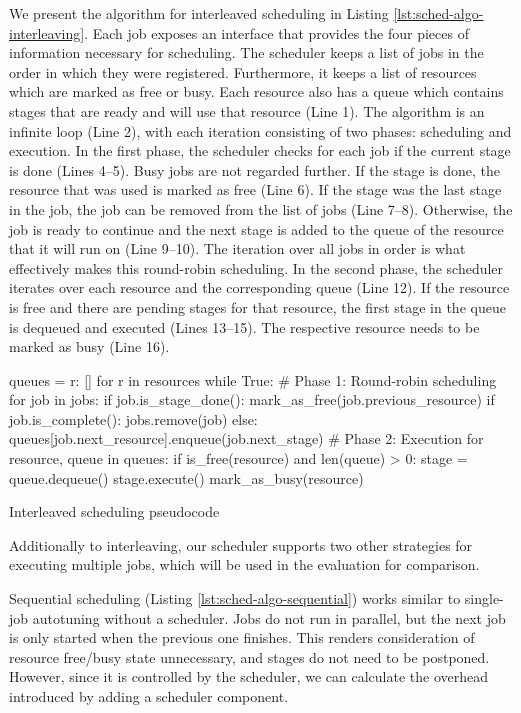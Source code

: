 We present the algorithm for interleaved scheduling in Listing \ref{lst:sched-algo-interleaving}. Each job exposes an interface that provides the four pieces of information necessary for scheduling. The scheduler keeps a list of jobs in the order in which they were registered. Furthermore, it keeps a list of resources which are marked as free or busy. Each resource also has a queue which contains stages that are ready and will use that resource (Line 1). The algorithm is an infinite loop (Line 2), with each iteration consisting of two phases: scheduling and execution. In the first phase, the scheduler checks for each job if the current stage is done (Lines 4--5). Busy jobs are not regarded further. If the stage is done, the resource that was used is marked as free (Line 6). If the stage was the last stage in the job, the job can be removed from the list of jobs (Line 7--8). Otherwise, the job is ready to continue and the next stage is added to the queue of the resource that it will run on (Line 9--10). The iteration over all jobs in order is what effectively makes this round-robin scheduling. In the second phase, the scheduler iterates over each resource and the corresponding queue (Line 12). If the resource is free and there are pending stages for that resource, the first stage in the queue is dequeued and executed (Lines 13--15). The respective resource needs to be marked as busy (Line 16).

\begin{listing}
\begin{pythoncode}
queues = {r: [] for r in resources}
while True:
    # Phase 1: Round-robin scheduling
    for job in jobs:
        if job.is_stage_done():
            mark_as_free(job.previous_resource)
            if job.is_complete():
                jobs.remove(job)
            else:
                queues[job.next_resource].enqueue(job.next_stage)
    # Phase 2: Execution
    for resource, queue in queues:
        if is_free(resource) and len(queue) > 0:
            stage = queue.dequeue()
            stage.execute()
            mark_as_busy(resource)
\end{pythoncode}
\unskip
\caption{Interleaved scheduling pseudocode}
\label{lst:sched-algo-interleaving}
\end{listing}

Additionally to interleaving, our scheduler supports two other strategies for executing multiple jobs, which will be used in the evaluation for comparison.

Sequential scheduling (Listing \ref{lst:sched-algo-sequential}) works similar to single-job autotuning without a scheduler. Jobs do not run in parallel, but the next job is only started when the previous one finishes. This renders consideration of resource free/busy state unnecessary, and stages do not need to be postponed. However, since it is controlled by the scheduler, we can calculate the overhead introduced by adding a scheduler component.


